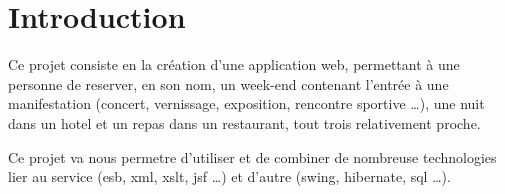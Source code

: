 \chapter{Introduction}

Ce projet consiste en la création d'une application web, permettant à une
personne de reserver, en son nom, un week-end contenant l'entrée à une
manifestation (concert, vernissage, exposition, rencontre sportive \ldots), une
nuit dans un hotel et un repas dans un restaurant, tout trois relativement
proche.

Ce projet va nous permetre d'utiliser et de combiner de nombreuse technologies
lier au service (esb, xml, xslt, jsf \ldots) et d'autre (swing, hibernate, sql
\ldots).

\clearpage
